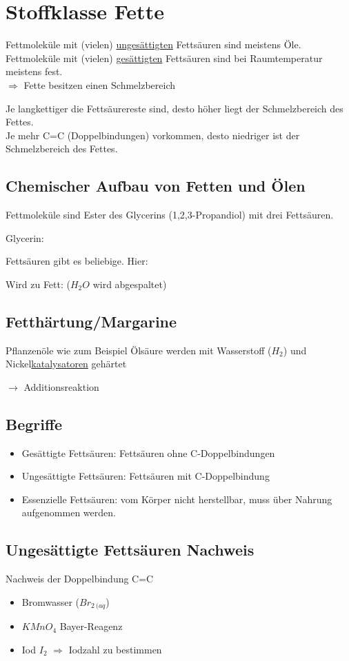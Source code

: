 \section{Stoffklasse Fette}
Fettmoleküle mit (vielen) \underline{ungesättigten} Fettsäuren sind meistens Öle. \\
Fettmoleküle mit (vielen) \underline{gesättigten} Fettsäuren sind bei Raumtemperatur meistens fest. \\
$\Rightarrow$ Fette besitzen einen Schmelzbereich 

Je langkettiger die Fettsäurereste sind, desto höher liegt der Schmelzbereich des Fettes. \\
Je mehr C=C (Doppelbindungen) vorkommen, desto niedriger ist der Schmelzbereich des Fettes.

\subsection{Chemischer Aufbau von Fetten und Ölen}
Fettmoleküle sind Ester des Glycerins (1,2,3-Propandiol) mit drei Fettsäuren.

Glycerin:\\

Fettsäuren gibt es beliebige. Hier:\\

Wird zu Fett: ($H_2O$ wird abgespaltet) \\

\subsection{Fetthärtung/Margarine}
Pflanzenöle wie zum Beispiel Ölsäure werden mit Wasserstoff ($H_2$) und 
Nickel\hyperref[sec:katalysator]{katalysatoren}
gehärtet

$\rightarrow$ Additionsreaktion

\subsection{Begriffe}
\begin{itemize}
    \item Gesättigte Fettsäuren: Fettsäuren ohne C-Doppelbindungen
    \item Ungesättigte Fettsäuren: Fettsäuren mit C-Doppelbindung
    \item Essenzielle Fettsäuren: vom Körper nicht herstellbar, muss über Nahrung aufgenommen werden.
\end{itemize}

\subsection{Ungesättigte Fettsäuren Nachweis}
\label{sec:nachweis_ung_fettsäuren}
Nachweis der Doppelbindung C=C
\begin{itemize}
    \item Bromwasser ($Br_{2\ (aq}$)
    \item $KMnO_4$ Bayer-Reagenz
    \item Iod $I_2$ $\Rightarrow$ Iodzahl zu bestimmen
\end{itemize}
